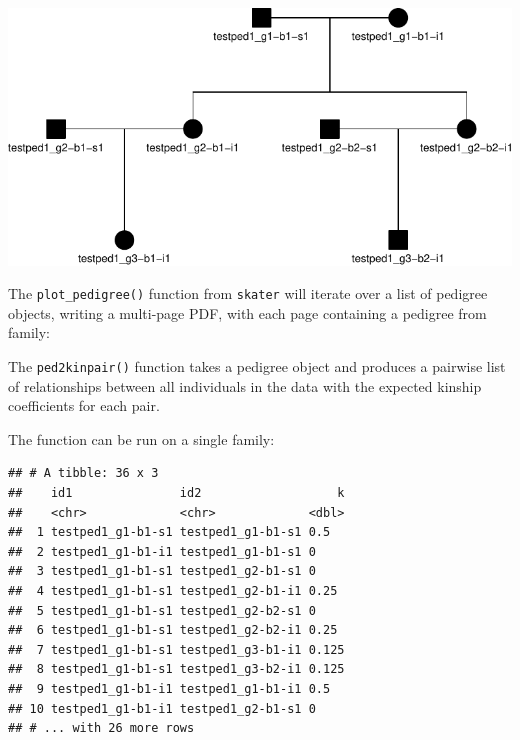 \documentclass[9pt,a4paper,]{extarticle}
\newenvironment{Shaded}{\begin{snugshade}}{\end{snugshade}}
\newcommand{\AttributeTok}[1]{\textcolor[rgb]{0.77,0.63,0.00}{#1}}
\newcommand{\DecValTok}[1]{\textcolor[rgb]{0.00,0.00,0.81}{#1}}
\newcommand{\FunctionTok}[1]{\textcolor[rgb]{0.00,0.00,0.00}{#1}}
\newcommand{\NormalTok}[1]{#1}
\newcommand{\SpecialCharTok}[1]{\textcolor[rgb]{0.00,0.00,0.00}{#1}}
\newcommand{\StringTok}[1]{\textcolor[rgb]{0.31,0.60,0.02}{#1}}
\begin{document}
\begin{center}\includegraphics{paper_files/figure-latex/plotped-1} \end{center}

The \texttt{plot\_pedigree()} function from \texttt{skater} will iterate over a list of pedigree objects, writing a multi-page PDF, with each page containing a pedigree from family:

\begin{Shaded}
\end{Shaded}

The \texttt{ped2kinpair()} function takes a pedigree object and produces a pairwise list of relationships between all individuals in the data with the expected kinship coefficients for each pair.

The function can be run on a single family:

\begin{Shaded}
\end{Shaded}

\begin{verbatim}
## # A tibble: 36 x 3
##    id1               id2                   k
##    <chr>             <chr>             <dbl>
##  1 testped1_g1-b1-s1 testped1_g1-b1-s1 0.5  
##  2 testped1_g1-b1-i1 testped1_g1-b1-s1 0    
##  3 testped1_g1-b1-s1 testped1_g2-b1-s1 0    
##  4 testped1_g1-b1-s1 testped1_g2-b1-i1 0.25 
##  5 testped1_g1-b1-s1 testped1_g2-b2-s1 0    
##  6 testped1_g1-b1-s1 testped1_g2-b2-i1 0.25 
##  7 testped1_g1-b1-s1 testped1_g3-b1-i1 0.125
##  8 testped1_g1-b1-s1 testped1_g3-b2-i1 0.125
##  9 testped1_g1-b1-i1 testped1_g1-b1-i1 0.5  
## 10 testped1_g1-b1-i1 testped1_g2-b1-s1 0    
## # ... with 26 more rows
\end{verbatim}
\end{document}
